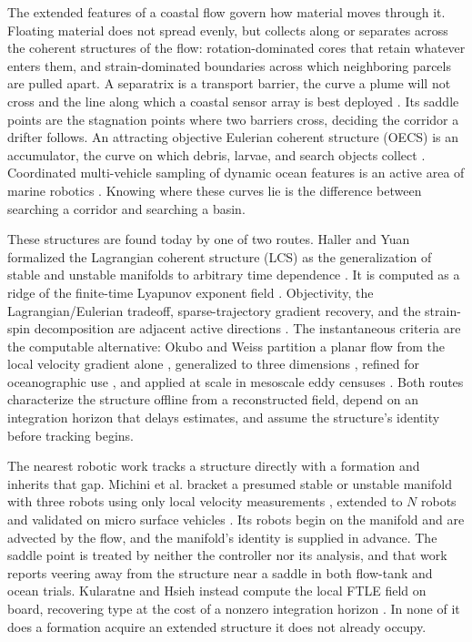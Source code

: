\documentclass[lettersize,journal]{IEEEtran}
\begin{document}
The extended features of a coastal flow govern how material moves
through it. Floating material does not spread evenly, but collects along or separates across
the coherent structures of the flow: rotation-dominated cores that
retain whatever enters them, and strain-dominated boundaries across
which neighboring parcels are pulled apart. A separatrix is a transport
barrier, the curve a plume will not cross and the line along which a
coastal sensor array is best deployed \cite{9,10,11}. Its saddle points
are the stagnation points where two barriers cross, deciding the
corridor a drifter follows. An attracting objective Eulerian
coherent structure (OECS) is an accumulator, the curve on which debris,
larvae, and search objects collect \cite{12}. Coordinated multi-vehicle sampling of dynamic ocean features is an
active area of marine robotics \cite{13,14,15}. Knowing where these curves lie is the
difference between searching a corridor and searching a basin.

These structures are found today by one of two routes. Haller and Yuan
formalized the Lagrangian coherent structure (LCS) as the
generalization of stable and unstable manifolds to arbitrary time
dependence \cite{9}. It is computed as a ridge of the finite-time
Lyapunov exponent field \cite{11}. Objectivity, the Lagrangian/Eulerian tradeoff, sparse-trajectory gradient recovery, and the strain-spin decomposition are adjacent active directions \cite{16,17,18,19,20}. The
instantaneous criteria are the computable alternative: Okubo and Weiss
partition a planar flow from the local velocity gradient alone
\cite{21,22}, generalized to three dimensions \cite{23}, refined for
oceanographic use \cite{24}, and applied at scale in mesoscale eddy
censuses \cite{25}. Both routes characterize the structure offline from a reconstructed
field, depend on an integration horizon that delays estimates, and
assume the structure's identity before tracking begins.

The nearest robotic work tracks a structure directly with a formation
and inherits that gap. Michini et al. bracket a presumed stable or
unstable manifold with three robots using only local velocity
measurements \cite{26}, extended to $N$ robots \cite{27} and validated
on micro surface vehicles \cite{28,29}. Its robots begin on the
manifold and are advected by the flow, and the manifold's identity is
supplied in advance. The saddle point is treated by neither the
controller nor its analysis, and that work reports veering away from
the structure near a saddle in both flow-tank and ocean trials. Kularatne
and Hsieh instead compute the local FTLE field on board, recovering
type at the cost of a nonzero integration horizon \cite{30}. In none of
it does a formation acquire an extended structure it does not already
occupy.
\end{document}
